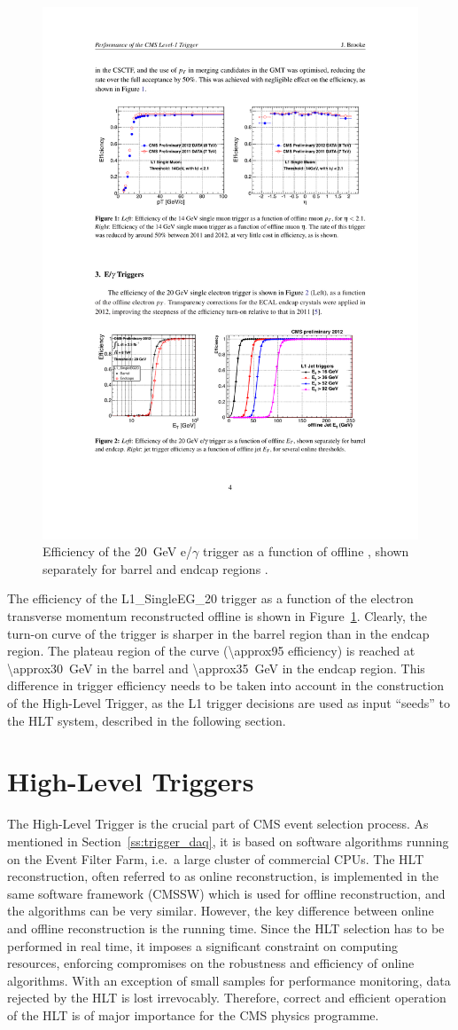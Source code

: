 \begin{figure}[!htbp]
  \centering
  \leavevmode
  \includegraphics[width=0.5\columnwidth]{L1_turnon}
  \caption[Efficiency of the \SI{20}{\GeV} e/$\gamma$ trigger]{Efficiency of the \SI{20}{\GeV} e/$\gamma$ trigger as a
  function of offline \ET, shown separately for barrel and endcap regions \autocite{L1_Brooke}.}
  \label{fig:L1_seed_turn_on_curve}
\end{figure}

The efficiency of the L1\_SingleEG\_20 trigger as a function of the electron transverse momentum reconstructed offline
is shown in Figure~\ref{fig:L1_seed_turn_on_curve}. Clearly, the turn-on curve of the trigger is sharper in the barrel
region than in the endcap region. The plateau region of the curve (\SI{\approx95}{\pc} efficiency) is reached at
\SI{\approx30}{\GeV} in the barrel and \SI{\approx35}{\GeV} in the endcap region. This difference in trigger efficiency
needs to be taken into account in the construction of the High-Level Trigger, as the L1 trigger decisions are used as
input ``seeds'' to the HLT system, described in the following section.

\section{High-Level Triggers}
\label{s:hlt_for_top_physics}
The High-Level Trigger \autocite{HLT} is the crucial part of CMS event selection process. As mentioned in
Section~\ref{ss:trigger_daq}, it is based on software algorithms running on the Event Filter Farm, i.e.\ a large cluster
of commercial CPUs. The HLT reconstruction, often referred to as online reconstruction, is implemented in the same
software framework (CMSSW) which is used for offline reconstruction, and the algorithms can be very similar. However,
the key difference between online and offline reconstruction is the running time. Since the HLT selection has to be
performed in real time, it imposes a significant constraint on computing resources, enforcing compromises on the
robustness and efficiency of online algorithms. With an exception of small samples for performance monitoring, data
rejected by the HLT is lost irrevocably. Therefore, correct and efficient operation of the HLT is of major importance
for the CMS physics programme.

